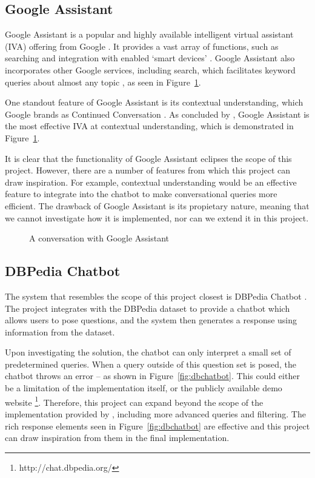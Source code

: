 \subsection{Google Assistant}
Google Assistant is a popular and highly available intelligent virtual assistant (IVA) offering from Google \cite{lopez2017alexa}. It provides a vast array of functions, such as searching and integration with enabled `smart devices' \cite{googleassistant}. Google Assistant also incorporates other Google services, including search, which facilitates keyword queries about almost any topic \cite{michaely2017keyword}, as seen in Figure~\ref{fig:assistant}.

One standout feature of Google Assistant is its contextual understanding, which Google brands as Continued Conversation \cite{paplauskaite2016}. As concluded by \cite{tulshan2019survey}, Google Assistant is the most effective IVA at contextual understanding, which is demonstrated in Figure~\ref{fig:assistant}.

It is clear that the functionality of Google Assistant eclipses the scope of this project. However, there are a number of features from which this project can draw inspiration. For example, contextual understanding would be an effective feature to integrate into the chatbot to make conversational queries more efficient. The drawback of Google Assistant is its propietary nature, meaning that we cannot investigate how it is implemented, nor can we extend it in this project.

\begin{figure}[h]
	\centering
    \qquad
	\caption{A conversation with Google Assistant}
	\label{fig:assistant}
\end{figure}

\newpage
\subsection{DBPedia Chatbot}
\label{sec:dbchatbot}
The system that resembles the scope of this project closest is DBPedia Chatbot \cite{ramngongausbeck2018}. The project integrates with the DBPedia dataset to provide a chatbot which allows users to pose questions, and the system then generates a response using information from the dataset.

Upon investigating the solution, the chatbot can only interpret a small set of predetermined queries. When a query outside of this question set is posed, the chatbot throws an error -- as shown in Figure~\ref{fig:dbchatbot}. This could either be a limitation of the implementation itself, or the publicly available demo website \footnote{http://chat.dbpedia.org/}. Therefore, this project can expand beyond the scope of the implementation provided by \citet{ramngongausbeck2018}, including more advanced queries and filtering. The rich response elements seen in Figure~\ref{fig:dbchatbot} are effective and this project can draw inspiration from them in the final implementation.

